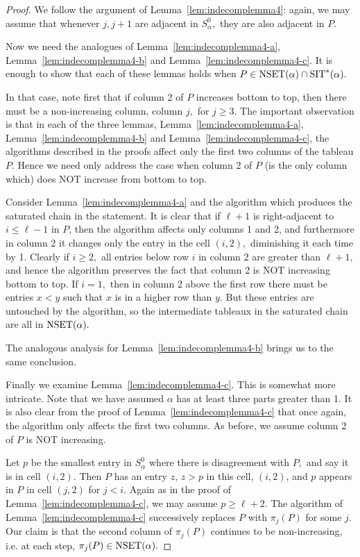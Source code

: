 \documentclass[12pt,letterpaper]{amsart}
\theoremstyle{definition}
\begin{document}
\begin{proof} We follow the argument of Lemma~\ref{lem:indecomplemma4}: again, we may assume that whenever $j,j+1$ are adjacent in $S^0_\alpha,$ they are also adjacent in $P.$

Now  we  need the analogues of Lemma~\ref{lem:indecomplemma4-a},  Lemma~\ref{lem:indecomplemma4-b} and Lemma~\ref{lem:indecomplemma4-c}.
It is enough to show that each of these lemmas holds when $P\in \operatorname{NSET}(\alpha)\cap\operatorname{SIT}^*(\alpha).$  

In that case, note first that if column 2 of $P$ increases bottom to top, then there must be a non-increasing column, column $j,$ for $j\ge 3.$  The important observation is that in each of the three lemmas, Lemma~\ref{lem:indecomplemma4-a},  Lemma~\ref{lem:indecomplemma4-b} and Lemma~\ref{lem:indecomplemma4-c}, the algorithms described in the proofs affect only the first two columns of the tableau $P.$ Hence we need only address the case when column 2 of $P$  (is the only column which) does NOT increase from bottom to top.

Consider Lemma~\ref{lem:indecomplemma4-a} and the algorithm which produces the saturated chain in the statement. It is clear that if $\ell+1$ is right-adjacent to $i\le \ell-1$ in $P$, then the algorithm affects only columns 1 and 2, and furthermore in column 2 it changes only the entry in the cell $(i,2),$ diminishing it each time by 1. Clearly if $i\ge 2,$ all entries below row $i$ in column 2 are greater than $\ell+1,$ and hence the algorithm  preserves the fact that column 2 is NOT increasing bottom to top.  If $i=1,$ then in column 2 above the first row there 
must be entries $x<y$ such that $x$ is in a higher row than $y.$ But these entries are untouched by the algorithm, so the intermediate tableaux in the saturated chain are all in $\operatorname{NSET}(\alpha).$ 

The analogous analysis for Lemma~\ref{lem:indecomplemma4-b} brings us to the same conclusion. 

Finally we examine Lemma~\ref{lem:indecomplemma4-c}. This is somewhat more intricate. 
Note that we have assumed $\alpha$ has at least three parts greater than 1. It is also clear from the proof of  Lemma~\ref{lem:indecomplemma4-c} that once again, the algorithm only affects the first two columns.
As before, we assume column 2 of $P$ is NOT increasing.   

Let $p$ be the smallest entry in $S^0_\alpha$ where there is disagreement with $P,$  and say it is in cell $(i,2).$ Then $P$ has an entry $z$, $z>p$ in this cell, $(i,2)$, and $p$ appears in $P$ in cell $(j,2)$ for $j<i.$ Again as in the proof of  Lemma~\ref{lem:indecomplemma4-c}, we may assume $p\ge\ell+2.$  The algorithm of  Lemma~\ref{lem:indecomplemma4-c} successively replaces $P$ with $\pi_j(P)$ for some $j$.  Our claim is that the second column of $\pi_j(P)$ continues to be non-increasing, i.e. 
at each step, $\pi_j(P)\in \operatorname{NSET}(\alpha).$


\end{proof}
\end{document}
